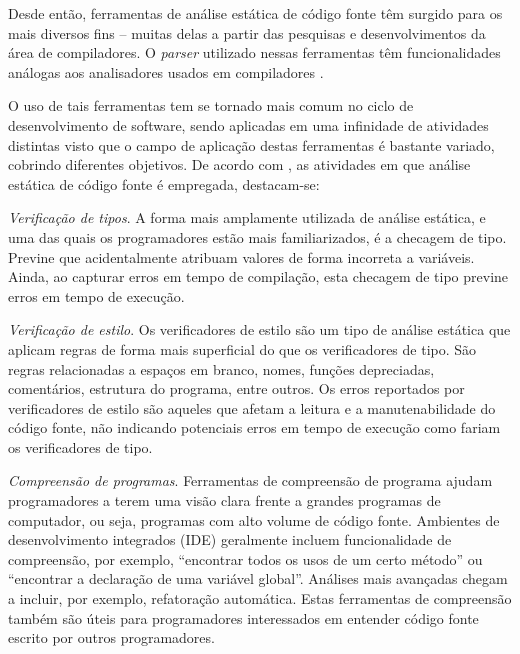 Desde então, ferramentas de análise estática de código fonte têm surgido para
os mais diversos fins -- muitas delas a partir das pesquisas e
desenvolvimentos da área de compiladores.  O {\it parser} utilizado nessas
ferramentas têm funcionalidades análogas aos analisadores usados em
compiladores \cite{Anderson2008}.

O uso de tais ferramentas tem se
tornado mais comum no ciclo de desenvolvimento de
software, sendo aplicadas em uma infinidade de atividades distintas visto que o
campo de aplicação destas ferramentas é bastante variado, cobrindo diferentes
objetivos. De acordo com , as atividades em que análise
estática de código fonte é empregada, destacam-se:

\begin{description}

  \item \textit{Verificação de tipos}. 
    A forma mais amplamente utilizada de análise estática, e uma das quais os
    programadores estão mais familiarizados, é a checagem de tipo.
    Previne que acidentalmente atribuam valores de forma incorreta a
    variáveis. Ainda, ao capturar erros em tempo de compilação, esta checagem
    de tipo previne erros em tempo de execução.

  \item \textit{Verificação de estilo}. 
    Os verificadores de estilo são um tipo de análise estática que aplicam regras
    de forma mais superficial do que os verificadores de tipo. São regras
    relacionadas a espaços em branco, nomes, funções depreciadas, comentários,
    estrutura do programa, entre outros. Os erros reportados por verificadores de
    estilo são aqueles que afetam a leitura e a manutenabilidade do
    código fonte, não indicando potenciais erros em tempo de execução como
    fariam os verificadores de tipo.

  \item \textit{Compreensão de programas}. 
    Ferramentas de compreensão de programa ajudam programadores a terem uma visão
    clara frente a grandes programas de computador, ou seja, programas com
    alto volume de código fonte. Ambientes de desenvolvimento integrados (IDE)
    geralmente incluem funcionalidade de compreensão, por exemplo, ``encontrar
    todos os usos de um certo método'' ou ``encontrar a declaração de uma
    variável global''. Análises mais avançadas chegam a incluir, por exemplo,
    refatoração automática. Estas ferramentas de compreensão também são úteis
    para programadores interessados em entender código fonte escrito por
    outros programadores.


\end{description}
